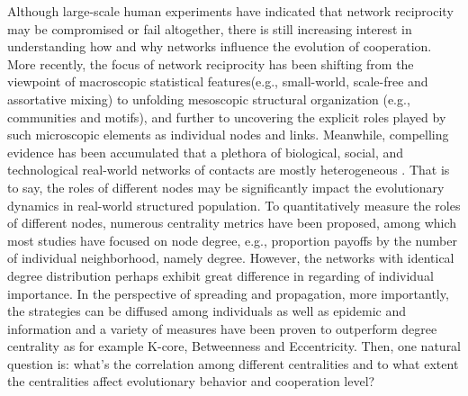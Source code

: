 \documentclass[preprint,12pt,3p]{elsarticle}
\begin{document}
Although large-scale human experiments have indicated that network reciprocity may be compromised or fail altogether\cite{Gracia-LázaroCuesta-18325,Gómez-GardeñesVilone-18358,CiminiSánchez-18189}, there is still increasing interest in understanding how and why networks influence the evolution of cooperation.
    More recently, the focus of network reciprocity has been shifting from the viewpoint of macroscopic statistical features(e.g., small-world\cite{WattsStrogatz-18356}, scale-free\cite{BarabasiR.-16803} and assortative mixing\cite{Newman-2132})
to unfolding mesoscopic structural organization (e.g., communities\cite{NewmanGirvan-580} and motifs\cite{MiloShen-Orr-431}), and further to uncovering the explicit roles played by such microscopic elements as individual nodes\cite{NishiShirado-18210} and links\cite{WangSzolnoki-18337}.
Meanwhile, compelling evidence has been accumulated that a plethora of biological,
social, and technological real-world networks of contacts are mostly
heterogeneous \cite{AmaralScala-18284,DorogovtsevMendes-18285,AlbertBarabási-18286}.
That is to say, the roles of different nodes may be significantly impact the evolutionary dynamics in
real-world structured population.
To quantitatively measure the roles of different nodes, numerous centrality metrics have been proposed,
among which most studies have focused on node degree, e.g., proportion payoffs by the number of individual neighborhood, namely degree\cite{SantosSantos-18293}.
However, the networks with identical degree distribution perhaps
exhibit great difference in regarding of individual importance.
In the perspective of spreading and propagation, more importantly, the strategies can be diffused among
individuals as well as epidemic and information and a variety of measures have been proven to outperform
degree centrality as for example K-core, Betweenness and Eccentricity\cite{HageHarary-18357}.
Then, one natural question is:
    what's the correlation among different centralities and
to what extent the centralities affect evolutionary behavior and cooperation level?


\end{document}
